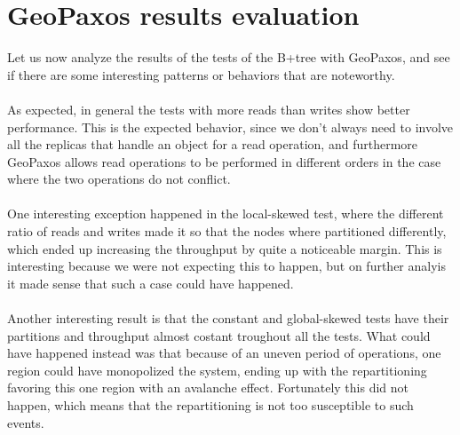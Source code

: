\section{GeoPaxos results evaluation}\label{sec:geopaxos-results-evaluation}
Let us now analyze the results of the tests of the B+tree with GeoPaxos, and see if there are some interesting patterns or behaviors that are noteworthy.
\\\\
As expected, in general the tests with more reads than writes show better performance. This is the expected behavior, since we don't always need to involve all the replicas that handle an object for a read operation, and furthermore GeoPaxos allows read operations to be performed in different orders in the case where the two operations do not conflict.
\\\\
One interesting exception happened in the local-skewed test, where the different ratio of reads and writes made it so that the nodes where partitioned differently, which ended up increasing the throughput by quite a noticeable margin. This is interesting because we were not expecting this to happen, but on further analyis it made sense that such a case could have happened.
\\\\
Another interesting result is that the constant and global-skewed tests have their partitions and throughput almost costant troughout all the tests. What could have happened instead was that because of an uneven period of operations, one region could have monopolized the system, ending up with the repartitioning favoring this one region with an avalanche effect. Fortunately this did not happen, which means that the repartitioning is not too susceptible to such events.
\\\\
